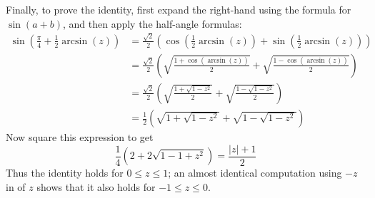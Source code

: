 \documentclass[12pt]{article}
\begin{document}
Finally, to prove the identity, first expand the right-hand  using the formula for $\sin(a+b)$, and then apply the half-angle formulas:
\begin{align*}
  \sin\left(\frac{\pi}{4} + \frac{1}{2}\arcsin(z)\right)
     &= \frac{\sqrt{2}}{2}\left(\cos\left(\frac{1}{2}\arcsin(z)\right) + \sin\left(\frac{1}{2}\arcsin(z)\right)\right) \\
     &= \frac{\sqrt{2}}{2}\left(\sqrt{\frac{1+\cos(\arcsin(z))}{2}} + \sqrt{\frac{1-\cos(\arcsin(z))}{2}}\right) \\
     &= \frac{\sqrt{2}}{2}\left(\sqrt{\frac{1+\sqrt{1-z^2}}{2}} + \sqrt{\frac{1-\sqrt{1-z^2}}{2}}\right) \\
     &= \frac{1}{2}\left(\sqrt{1+\sqrt{1-z^2}}+\sqrt{1-\sqrt{1-z^2}}\right)
\end{align*}
Now square this expression to get
\[
  \frac{1}{4}\left(2 + 2\sqrt{1-1+z^2}\right) = \frac{\lvert z\rvert+1}{2}
\]
Thus the identity holds for $0\leq z \leq 1$; an almost identical computation using $-z$ in  of $z$ shows that it also holds for $-1\leq z\leq 0$.

\end{document}
